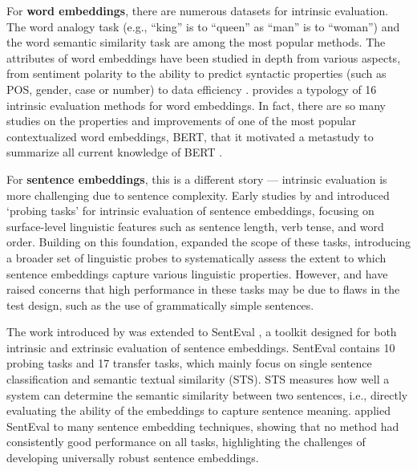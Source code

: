 For \textbf{word embeddings}, there are numerous datasets for intrinsic evaluation. The word analogy task (e.g., ``king'' is to ``queen'' as ``man'' is to ``woman'')  \citep{Mikolov13a, mikolov-etal-2013-linguistic, gladkova-etal-2016-analogy} and the word semantic similarity task \citep{faruqui-dyer-2014-community, hill-etal-2015-simlex, gerz-etal-2016-simverb} are among the most popular methods. The attributes of word embeddings have been studied in depth from various aspects, from sentiment polarity \citep{chen2013expressive} to the ability to predict syntactic properties (such as POS, gender, case or number) \citep{kohn-2015-whats} to data efficiency \citep{JastrzebskiLC17}. \cite{bakarov} provides a typology of 16 intrinsic evaluation methods for word embeddings. In fact, there are so many studies on the properties and improvements of one of the most popular contextualized word embeddings, BERT, that it motivated a metastudy to summarize all current knowledge of BERT \citep{bertology}.



For \textbf{sentence embeddings}, this is a different story --- intrinsic evaluation is more challenging due to sentence complexity. Early studies by \cite{Adi16} and \cite{ettinger-etal-2016-probing} introduced `probing tasks' for intrinsic evaluation of sentence embeddings, focusing on surface-level linguistic features such as sentence length, verb tense, and word order. Building on this foundation, \cite{conneau2018cram} expanded the scope of these tasks, introducing a broader set of linguistic probes to systematically assess the extent to which sentence embeddings capture various linguistic properties. However, \cite{Linzen_2016} and \cite{bacon2018probing} have raised concerns that high performance in these tasks may be due to flaws in the test design, such as the use of grammatically simple sentences.

The work introduced by \cite{conneau2018cram} was extended to SentEval \citep{senteval}, a toolkit designed for both intrinsic and extrinsic evaluation of sentence embeddings. SentEval contains 10 probing tasks and 17 transfer tasks, which mainly focus on single sentence classification and semantic textual similarity (STS). STS measures how well a system can determine the semantic similarity between two sentences, i.e., directly evaluating the ability of the embeddings to capture sentence meaning. \cite{Perone2018} applied SentEval to many sentence embedding techniques, showing that no method had consistently good performance on all tasks, highlighting the challenges of developing universally robust sentence embeddings.

